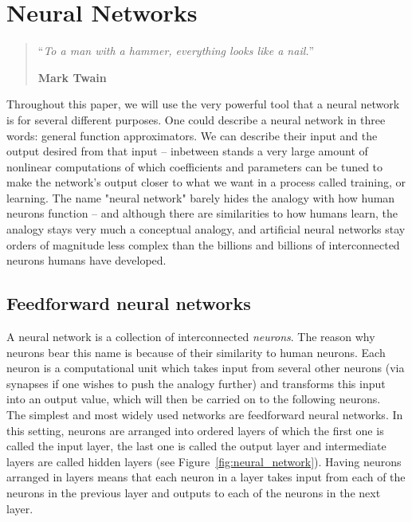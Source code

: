 \chapter{Neural Networks}
\begin{quotation}
\noindent ``\emph{To a man with a hammer, everything looks like a nail.}''
\begin{flushright}\textbf{Mark Twain}\end{flushright}
\end{quotation}

\vspace*{0.5cm}

Throughout this paper, we will use the very powerful tool that a neural network
is for several different purposes. One could describe a neural network in 
three words: general function approximators. We can describe their input
and the output desired from that input -- inbetween stands a very large amount of
nonlinear computations of which coefficients and parameters can be tuned to
make the network's output closer to what we want in a process called training, 
or learning. The name "neural network"
barely hides the analogy with how human neurons function -- and although there
are similarities to how humans learn, the analogy stays very much a conceptual
analogy, and artificial neural networks stay orders of magnitude less complex
than the billions and billions of interconnected neurons humans have developed. 

\section{Feedforward neural networks}
A neural network is a collection of interconnected \textit{neurons}. The
reason why neurons bear this name is because of their similarity to 
human neurons. Each neuron is a computational unit which takes input
from several other neurons (via synapses if one wishes to push the analogy further)
and transforms this input into an output value, which will then be carried on
to the following neurons.\\

The simplest and most widely used networks are feedforward neural networks. In
this setting, neurons are arranged into ordered layers of which the first one is
called the input layer, the last one is called the output layer and
intermediate layers are called hidden layers
(see Figure~\ref{fig:neural_network}). Having neurons arranged in layers
means that each neuron in a layer takes input from each of the neurons
in the previous layer and outputs to each of the neurons in the next layer.\\

